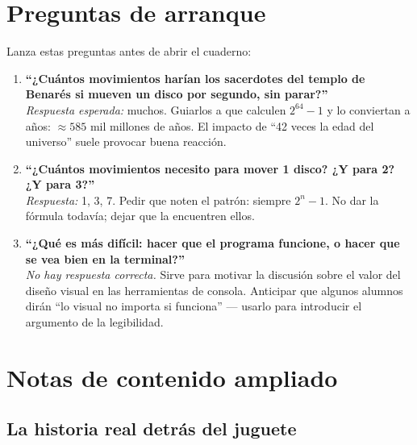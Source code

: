\documentclass[12pt, oneside]{article}
\begin{document}
\section{Preguntas de arranque}

\begin{notaprofesor}
  Lanza estas preguntas antes de abrir el cuaderno:

  \begin{enumerate}
    \item \textbf{``¿Cuántos movimientos harían los sacerdotes del templo de
          Benarés si mueven un disco por segundo, sin parar?''}\\
          \textit{Respuesta esperada:} muchos.  Guiarlos a que calculen
          $2^{64} - 1$ y lo conviertan a años: $\approx 585$ mil millones de años.
          El impacto de ``42 veces la edad del universo'' suele provocar buena reacción.

    \item \textbf{``¿Cuántos movimientos necesito para mover 1 disco? ¿Y para 2?
          ¿Y para 3?''}\\
          \textit{Respuesta:} 1, 3, 7.  Pedir que noten el patrón: siempre
          $2^n - 1$.  No dar la fórmula todavía; dejar que la encuentren ellos.

    \item \textbf{``¿Qué es más difícil: hacer que el programa funcione,
          o hacer que se vea bien en la terminal?''}\\
          \textit{No hay respuesta correcta.} Sirve para motivar la discusión
          sobre el valor del diseño visual en las herramientas de consola.
          Anticipar que algunos alumnos dirán ``lo visual no importa si funciona''
          — usarlo para introducir el argumento de la legibilidad.
  \end{enumerate}
\end{notaprofesor}

\section{Notas de contenido ampliado}

\subsection{La historia real detrás del juguete}
\end{document}
